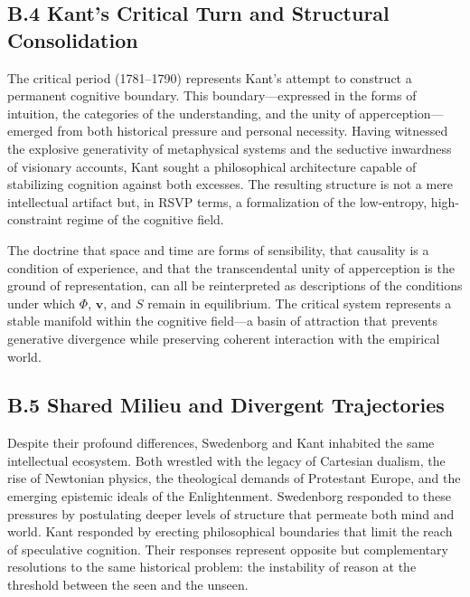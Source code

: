 \documentclass[12pt]{article}
\begin{document}
\subsection*{B.4 Kant’s Critical Turn and Structural Consolidation}

The critical period (1781–1790) represents Kant’s attempt to construct a 
permanent cognitive boundary. This boundary—expressed in the forms of 
intuition, the categories of the understanding, and the unity of apperception—
emerged from both historical pressure and personal necessity. Having witnessed 
the explosive generativity of metaphysical systems and the seductive inwardness 
of visionary accounts, Kant sought a philosophical architecture capable of 
stabilizing cognition against both excesses. The resulting structure is not a 
mere intellectual artifact but, in RSVP terms, a formalization of the low-entropy, 
high-constraint regime of the cognitive field.

The doctrine that space and time are forms of sensibility, that causality is a 
condition of experience, and that the transcendental unity of apperception is 
the ground of representation, can all be reinterpreted as descriptions of the 
conditions under which $\Phi$, $\mathbf{v}$, and $S$ remain in equilibrium.  
The critical system represents a stable manifold within the cognitive field—a 
basin of attraction that prevents generative divergence while preserving 
coherent interaction with the empirical world.

\subsection*{B.5 Shared Milieu and Divergent Trajectories}

Despite their profound differences, Swedenborg and Kant inhabited the same 
intellectual ecosystem. Both wrestled with the legacy of Cartesian dualism, the 
rise of Newtonian physics, the theological demands of Protestant Europe, and 
the emerging epistemic ideals of the Enlightenment. Swedenborg responded to 
these pressures by postulating deeper levels of structure that permeate both 
mind and world. Kant responded by erecting philosophical boundaries that limit 
the reach of speculative cognition. Their responses represent opposite but 
complementary resolutions to the same historical problem: the instability of 
reason at the threshold between the seen and the unseen.
\end{document}
